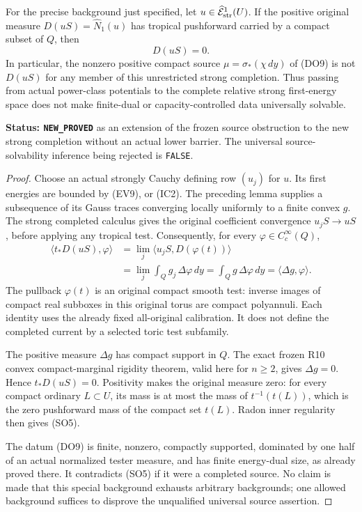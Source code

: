 \begin{theorem}
\label{thm:r11-strong-completed-compact-source-obstruction}
For the precise background just specified, let
$u\in\widehat{\mathcal E}^{1}_{\rm str}(U)$.
If the positive original measure $D(uS)=\widehat N_1(u)$
has tropical pushforward carried by a compact subset of $Q$,
then
\[
                              D(uS)=0.
 \tag{SO5}
\]
In particular, the nonzero positive compact source
$\mu=\sigma_*(\chi\,dy)$ of (DO9) is not $D(uS)$ for
any member of this unrestricted strong completion.
Thus passing from actual power-class potentials to the complete
relative strong first-energy space does not make finite-dual or
capacity-controlled data universally solvable.
\end{theorem}

\noindent\textbf{Status: \texttt{NEW\_PROVED}} as an extension
of the frozen source obstruction to the new strong completion
without an actual lower barrier.  The universal source-solvability
inference being rejected is \texttt{FALSE}.

\begin{proof}
Choose an actual strongly Cauchy defining row $(u_j)$ for $u$.
Its first energies are bounded by (EV9), or (IC2).
The preceding lemma supplies a subsequence of its Gauss traces
converging locally uniformly to a finite convex $g$.
The strong completed calculus gives the original coefficient
convergence $u_jS\to uS$, before applying any tropical test.
Consequently, for every $\varphi\in C_c^\infty(Q)$,
\[
 \begin{split}
 \langle t_*D(uS),\varphi\rangle
   &=\lim_j\langle u_jS,D(\varphi(t))\rangle\\
   &=\lim_j\int_Qg_j\,\Delta\varphi\,dy
     =\int_Qg\,\Delta\varphi\,dy
     =\langle\Delta g,\varphi\rangle.
 \end{split}
 \tag{SO6}
\]
The pullback $\varphi(t)$ is an original compact smooth test:
inverse images of compact real subboxes in this original torus
are compact polyannuli.  Each identity uses the already fixed
all-original calibration.  It does not define the completed
current by a selected toric test subfamily.

The positive measure $\Delta g$ has compact support in $Q$.
The exact frozen R10 convex compact-marginal rigidity theorem,
valid here for $n\geq2$, gives $\Delta g=0$.
Hence $t_*D(uS)=0$.  Positivity makes the original measure zero:
for every compact ordinary $L\subset U$, its mass is at most
the mass of $t^{-1}(t(L))$, which is the zero pushforward
mass of the compact set $t(L)$.  Radon inner regularity
then gives (SO5).

The datum (DO9) is finite, nonzero, compactly supported,
dominated by one half of an actual normalized tester measure,
and has finite energy-dual size, as already proved there.
It contradicts (SO5) if it were a completed source.
No claim is made that this special background exhausts arbitrary
backgrounds; one allowed background suffices to disprove the
unqualified universal source assertion.
\end{proof}

